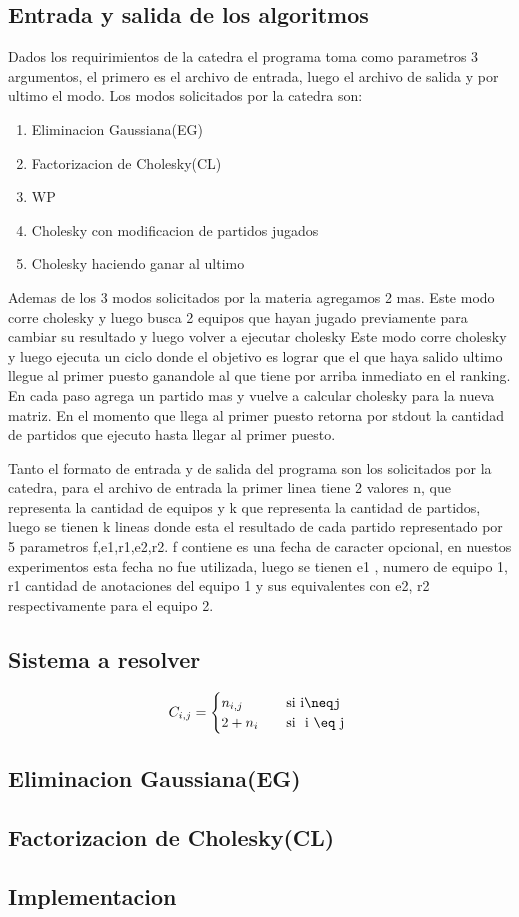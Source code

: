 \subsection{Entrada y salida de los algoritmos}

Dados los requirimientos de la catedra el programa toma como parametros 3 argumentos, el primero es el archivo de entrada, luego el archivo de salida y
por ultimo el modo. Los modos solicitados por la catedra son:
\begin{enumerate}
    \item Eliminacion Gaussiana(EG)
\item Factorizacion de Cholesky(CL)
    \item WP
    \item Cholesky con modificacion de partidos jugados
    \item Cholesky haciendo ganar al ultimo
    \end{enumerate}
    Ademas de los 3 modos solicitados por la materia agregamos 2 mas.
    Este modo corre cholesky y luego busca 2 equipos que hayan jugado previamente para cambiar su resultado y luego volver a ejecutar cholesky
    Este modo corre cholesky y luego ejecuta un ciclo donde el objetivo es lograr que el que haya salido ultimo llegue al primer puesto ganandole
    al que tiene por arriba inmediato en el ranking. En cada paso agrega un partido mas y vuelve a calcular cholesky para la nueva matriz.
    En el momento que llega al primer puesto retorna por stdout la cantidad de partidos que ejecuto hasta llegar al primer puesto.

    Tanto el formato de entrada y de salida del programa son los solicitados por la catedra, para el archivo de entrada la primer linea tiene 2 valores n,
    que representa la cantidad de equipos  y k que representa la cantidad de partidos,
    luego se tienen k lineas donde esta el resultado de cada partido representado por 5 parametros f,e1,r1,e2,r2.
    f contiene es una fecha de caracter opcional, en nuestos experimentos esta fecha no fue utilizada, luego se tienen e1 , numero de equipo 1,
    r1 cantidad de anotaciones del equipo 1 y sus equivalentes con e2, r2 respectivamente para el equipo 2.


\subsection{Sistema a resolver}

    \[ C_{i,j} =
    \begin{cases}
        n_{i,j}       & \quad \text{si }  \text{i\neqj}\\
        2+n_i & \quad \text{si } \text{ i \eq j }\\
    \end{cases}
    \]

\subsection{Eliminacion Gaussiana(EG)}

\subsection{Factorizacion de Cholesky(CL)}

\subsection{Implementacion}
